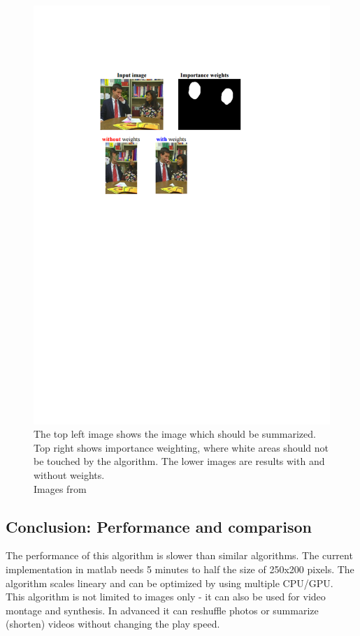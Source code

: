 \begin{figure}[h]
\centering
\includegraphics[scale=0.8]{img/importance_weights}
\caption[Importance weights]{The top left image shows the image which should be summarized. Top right shows importance weighting, where white areas should not be touched by the algorithm. The lower images are results with and without weights.\\ Images from \cite{bisi}}
\label{fig:Importance_weights}
\end{figure}

\subsection{Conclusion: Performance and comparison}
The performance of this algorithm is slower than similar algorithms. The current implementation in matlab needs 5 minutes to half the size of 250x200 pixels. The algorithm scales lineary and can be optimized by using multiple CPU/GPU. \cite{bisi}\\
This algorithm is not limited to images only - it can also be used for video montage and synthesis. In advanced it can reshuffle photos or summarize (shorten) videos without changing the play speed.

